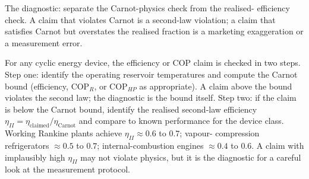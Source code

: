 The diagnostic: separate the Carnot-physics check from the realised-
efficiency check. A claim that violates Carnot is a second-law
violation; a claim that satisfies Carnot but overstates the realised
fraction is a marketing exaggeration or a measurement error.

\begin{principle}
For any cyclic energy device, the efficiency or COP claim is checked
in two steps. Step one: identify the operating reservoir temperatures
and compute the Carnot bound (efficiency, $\text{COP}_R$, or
$\text{COP}_{HP}$ as appropriate). A claim above the bound violates
the second law; the diagnostic is the bound itself. Step two: if the
claim is below the Carnot bound, identify the realised second-law
efficiency $\eta_{II} = \eta_{\text{claimed}}/\eta_{\text{Carnot}}$
and compare to known performance for the device class. Working
Rankine plants achieve $\eta_{II} \approx 0.6$ to $0.7$; vapour-
compression refrigerators $\approx 0.5$ to $0.7$; internal-combustion
engines $\approx 0.4$ to $0.6$. A claim with implausibly high
$\eta_{II}$ may not violate physics, but it is the diagnostic for a
careful look at the measurement protocol.
\end{principle}

